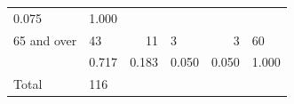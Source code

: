 \documentclass[11pt,a4paper,openany]{book}
\begin{document}
\begin{longtable}[]{@{}llrlrl@{}}
\begin{minipage}[t]{0.06\columnwidth}
0.075\strut
\end{minipage} & \begin{minipage}[t]{0.04\columnwidth}\raggedright\strut
1.000\strut
\end{minipage}\tabularnewline
\begin{minipage}[t]{0.30\columnwidth}\raggedright\strut
65 and over\strut
\end{minipage} & \begin{minipage}[t]{0.30\columnwidth}\raggedright\strut
43\strut
\end{minipage} & \begin{minipage}[t]{0.06\columnwidth}\raggedleft\strut
11\strut
\end{minipage} & \begin{minipage}[t]{0.06\columnwidth}\raggedright\strut
3\strut
\end{minipage} & \begin{minipage}[t]{0.06\columnwidth}\raggedleft\strut
3\strut
\end{minipage} & \begin{minipage}[t]{0.04\columnwidth}\raggedright\strut
60\strut
\end{minipage}\tabularnewline
\begin{minipage}[t]{0.30\columnwidth}\raggedright\strut
\strut
\end{minipage} & \begin{minipage}[t]{0.30\columnwidth}\raggedright\strut
0.717\strut
\end{minipage} & \begin{minipage}[t]{0.06\columnwidth}\raggedleft\strut
0.183\strut
\end{minipage} & \begin{minipage}[t]{0.06\columnwidth}\raggedright\strut
0.050\strut
\end{minipage} & \begin{minipage}[t]{0.06\columnwidth}\raggedleft\strut
0.050\strut
\end{minipage} & \begin{minipage}[t]{0.04\columnwidth}\raggedright\strut
1.000\strut
\end{minipage}\tabularnewline
\begin{minipage}[t]{0.30\columnwidth}\raggedright\strut
Total\strut
\end{minipage} & \begin{minipage}[t]{0.30\columnwidth}\raggedright\strut
116\strut
\end{minipage} & \begin{minipage}[t]{0.06\columnwidth}\raggedleft\strut

\end{minipage}
\end{longtable}
\end{document}
